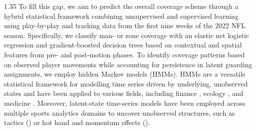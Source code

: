 \documentclass[12pt,a4paper]{article}
\begin{document}
\begin{spacing}{1.35}
To fill this gap, we aim to predict the overall coverage scheme through a hybrid statistical framework combining unsupervised and supervised learning using play-by-play and tracking data from the first nine weeks of the 2022 NFL season. Specifically, we classify man- or zone coverage with an elastic net logistic regression and gradient-boosted decision trees based on contextual and spatial features from pre- and post-motion phases. 
To identify coverage patterns based on observed player movements while accounting for persistence in latent guarding assignments, we employ hidden Markov models (HMMs).
HMMs are a versatile statistical framework for modelling time series driven by underlying, unobserved states and have been applied to various fields, including finance \citep{liu2012stock, zhang2019high}, ecology \citep{mcclintock2020uncovering, mews2022multistate}, and medicine \citep{amoros2019continuous, soper2020hidden}.
Moreover, latent-state time-series models have been employed across multiple sports analytics domains to uncover unobserved structures, such as tactics (\citealp{otting2023football, adam2024markov}) or hot hand and momentum effects (\citealp{albert93, michels2023bettors, winkelmann2025momentum}).


\end{spacing}
\end{document}
